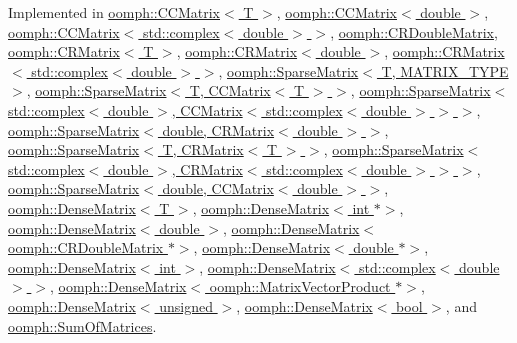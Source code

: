 Implemented in \hyperlink{classoomph_1_1CCMatrix_ac3b138b2ed470866999f2a92f3e1f239}{oomph\+::\+C\+C\+Matrix$<$ T $>$}, \hyperlink{classoomph_1_1CCMatrix_ac3b138b2ed470866999f2a92f3e1f239}{oomph\+::\+C\+C\+Matrix$<$ double $>$}, \hyperlink{classoomph_1_1CCMatrix_ac3b138b2ed470866999f2a92f3e1f239}{oomph\+::\+C\+C\+Matrix$<$ std\+::complex$<$ double $>$ $>$}, \hyperlink{classoomph_1_1CRDoubleMatrix_ab0887b5420752c47bfc14777006bcc1e}{oomph\+::\+C\+R\+Double\+Matrix}, \hyperlink{classoomph_1_1CRMatrix_abf764862746afbbe2655a41bdf726327}{oomph\+::\+C\+R\+Matrix$<$ T $>$}, \hyperlink{classoomph_1_1CRMatrix_abf764862746afbbe2655a41bdf726327}{oomph\+::\+C\+R\+Matrix$<$ double $>$}, \hyperlink{classoomph_1_1CRMatrix_abf764862746afbbe2655a41bdf726327}{oomph\+::\+C\+R\+Matrix$<$ std\+::complex$<$ double $>$ $>$}, \hyperlink{classoomph_1_1SparseMatrix_a4c638f36db786e159565e1f890402ed2}{oomph\+::\+Sparse\+Matrix$<$ T, M\+A\+T\+R\+I\+X\+\_\+\+T\+Y\+P\+E $>$}, \hyperlink{classoomph_1_1SparseMatrix_a4c638f36db786e159565e1f890402ed2}{oomph\+::\+Sparse\+Matrix$<$ T, C\+C\+Matrix$<$ T $>$ $>$}, \hyperlink{classoomph_1_1SparseMatrix_a4c638f36db786e159565e1f890402ed2}{oomph\+::\+Sparse\+Matrix$<$ std\+::complex$<$ double $>$, C\+C\+Matrix$<$ std\+::complex$<$ double $>$ $>$ $>$}, \hyperlink{classoomph_1_1SparseMatrix_a4c638f36db786e159565e1f890402ed2}{oomph\+::\+Sparse\+Matrix$<$ double, C\+R\+Matrix$<$ double $>$ $>$}, \hyperlink{classoomph_1_1SparseMatrix_a4c638f36db786e159565e1f890402ed2}{oomph\+::\+Sparse\+Matrix$<$ T, C\+R\+Matrix$<$ T $>$ $>$}, \hyperlink{classoomph_1_1SparseMatrix_a4c638f36db786e159565e1f890402ed2}{oomph\+::\+Sparse\+Matrix$<$ std\+::complex$<$ double $>$, C\+R\+Matrix$<$ std\+::complex$<$ double $>$ $>$ $>$}, \hyperlink{classoomph_1_1SparseMatrix_a4c638f36db786e159565e1f890402ed2}{oomph\+::\+Sparse\+Matrix$<$ double, C\+C\+Matrix$<$ double $>$ $>$}, \hyperlink{classoomph_1_1DenseMatrix_aa02dc7c9b2f4e1cc1204cc8281f030f9}{oomph\+::\+Dense\+Matrix$<$ T $>$}, \hyperlink{classoomph_1_1DenseMatrix_aa02dc7c9b2f4e1cc1204cc8281f030f9}{oomph\+::\+Dense\+Matrix$<$ int $\ast$$>$}, \hyperlink{classoomph_1_1DenseMatrix_aa02dc7c9b2f4e1cc1204cc8281f030f9}{oomph\+::\+Dense\+Matrix$<$ double $>$}, \hyperlink{classoomph_1_1DenseMatrix_aa02dc7c9b2f4e1cc1204cc8281f030f9}{oomph\+::\+Dense\+Matrix$<$ oomph\+::\+C\+R\+Double\+Matrix $\ast$$>$}, \hyperlink{classoomph_1_1DenseMatrix_aa02dc7c9b2f4e1cc1204cc8281f030f9}{oomph\+::\+Dense\+Matrix$<$ double $\ast$$>$}, \hyperlink{classoomph_1_1DenseMatrix_aa02dc7c9b2f4e1cc1204cc8281f030f9}{oomph\+::\+Dense\+Matrix$<$ int $>$}, \hyperlink{classoomph_1_1DenseMatrix_aa02dc7c9b2f4e1cc1204cc8281f030f9}{oomph\+::\+Dense\+Matrix$<$ std\+::complex$<$ double $>$ $>$}, \hyperlink{classoomph_1_1DenseMatrix_aa02dc7c9b2f4e1cc1204cc8281f030f9}{oomph\+::\+Dense\+Matrix$<$ oomph\+::\+Matrix\+Vector\+Product $\ast$$>$}, \hyperlink{classoomph_1_1DenseMatrix_aa02dc7c9b2f4e1cc1204cc8281f030f9}{oomph\+::\+Dense\+Matrix$<$ unsigned $>$}, \hyperlink{classoomph_1_1DenseMatrix_aa02dc7c9b2f4e1cc1204cc8281f030f9}{oomph\+::\+Dense\+Matrix$<$ bool $>$}, and \hyperlink{classoomph_1_1SumOfMatrices_a13408a013cf37a9455b9813b7a19fb0e}{oomph\+::\+Sum\+Of\+Matrices}.



